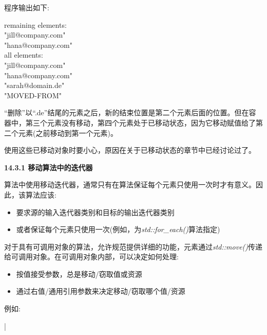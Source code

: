 程序输出如下:\par

\begin{tcolorbox}[colback=white,colframe=black]
remaining elements: \\
"jill@company.com" \\
"hana@company.com" \\
all elements: \\
"jill@company.com" \\
"hana@company.com" \\
"sarah@domain.de" \\
"MOVED-FROM"
\end{tcolorbox}	

“删除”以“.de”结尾的元素之后，新的结束位置是第二个元素后面的位置。但在容器中，第三个元素没有移动，第四个元素处于已移动状态，因为它移动赋值给了第二个元素(之前移动到第一个元素)。\par

使用这些已移动对象时要小心，原因在关于已移动状态的章节中已经讨论过了。\par

\hspace*{\fill} \par %
\textbf{14.3.1 移动算法中的迭代器}

算法中使用移动迭代器，通常只有在算法保证每个元素只使用一次时才有意义。因此，该算法应该:\par

\begin{itemize}
	\item 要求源的输入迭代器类别和目标的输出迭代器类别
	\item 或者保证每个元素只使用一次(例如，为\textit{std::for\_each()}算法指定)
\end{itemize}

对于具有可调用对象的算法，允许规范提供详细的功能，元素通过\textit{std::move()}传递给可调用对象。在可调用对象内部，可以决定如何处理:\par

\begin{itemize}
	\item 按值接受参数，总是移动/窃取值或资源
	\item 通过右值/通用引用参数来决定移动/窃取哪个值/资源
\end{itemize}

例如:\par

{\color{red}{lib/foreachmove.cpp}}|\par


